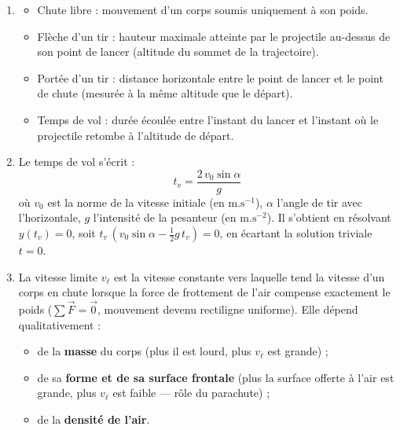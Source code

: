 \documentclass[11pt]{article}
\newcommand{\cle}[1]{{\popxbold\color{popdark}#1}}
\begin{document}
\begin{corrige}
\begin{enumerate}
\item \begin{itemize}
\item \cle{Chute libre} : mouvement d'un corps soumis uniquement à son poids.
\item \cle{Flèche} d'un tir : hauteur maximale atteinte par le projectile au-dessus de son point de lancer (altitude du sommet de la trajectoire).
\item \cle{Portée} d'un tir : distance horizontale entre le point de lancer et le point de chute (mesurée à la même altitude que le départ).
\item \cle{Temps de vol} : durée écoulée entre l'instant du lancer et l'instant où le projectile retombe à l'altitude de départ.
\end{itemize}
\item Le temps de vol s'écrit :
\[ t_v = \frac{2\,v_0\sin\alpha}{g} \]
où $v_0$ est la norme de la vitesse initiale (en $\mathrm{m.s^{-1}}$), $\alpha$ l'angle de tir avec l'horizontale, $g$ l'intensité de la pesanteur (en $\mathrm{m.s^{-2}}$). Il s'obtient en résolvant $y(t_v) = 0$, soit $t_v\,(v_0\sin\alpha - \frac{1}{2}g\,t_v) = 0$, en écartant la solution triviale $t = 0$.
\item La \cle{vitesse limite} $v_\ell$ est la vitesse constante vers laquelle tend la vitesse d'un corps en chute lorsque la force de frottement de l'air compense exactement le poids ($\sum \vec{F} = \vec{0}$, mouvement devenu rectiligne uniforme). Elle dépend qualitativement :
\begin{itemize}
\item de la \textbf{masse} du corps (plus il est lourd, plus $v_\ell$ est grande) ;
\item de sa \textbf{forme et de sa surface frontale} (plus la surface offerte à l'air est grande, plus $v_\ell$ est faible — rôle du parachute) ;
\item de la \textbf{densité de l'air}.
\end{itemize}
\end{enumerate}
\end{corrige}
\end{document}
